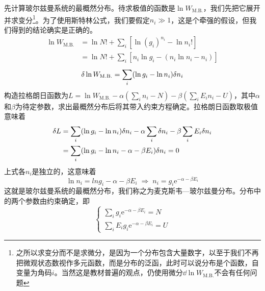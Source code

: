 \documentclass[../../main.tex]{subfiles}
\begin{document}
先计算玻尔兹曼系统的最概然分布。待求极值的函数是\(\ln W_{\mathrm{M.B.}}\)，我们先把它展开并求变分\footnote{之所以求变分而不是求微分，是因为一个分布包含大量数字，以至于我们不再把微观状态数视作多元函数，而是分布的泛函，此时可以说分布是个函数，自变量为角码\(i\)。当然这是教材普遍的观点，仍使用微分\(\dd \ln W_{\mathrm{M.B.}}\)不会有任何问题}。为了使用斯特林公式，我们要假定\(n_i\gg 1\)，这是个牵强的假设，但我们得到的结论确实是正确的。
\begin{equation*}
    \begin{split}
        \ln W_{\mathrm{M.B.}}&=\ln N!+\sum_i \left[\ln (g_i)^{n_i}-\ln n_i!\right]\\
        &=\ln N!+\sum_i [n_i\ln g_i-\left(n_i\ln n_i-n_i\right)]
    \end{split}
\end{equation*}
\begin{equation*}
    \var \ln W_{\mathrm{M.B.}}=\sum_i(\ln g_i-\ln n_i)\var n_i
\end{equation*}
构造拉格朗日函数为\(L=\ln W_{\mathrm{M.B.}}-\alpha\left(\sum_i n_i-N\right)-\beta\left(\sum_i E_in_i-U\right)\)，其中\(\alpha\)和\(\beta\)为待定参数，求出最概然分布后将其带入约束方程确定。拉格朗日函数取极值意味着
\begin{equation*}
    \begin{split}
        \var L&=\sum_i (\ln g_i-\ln n_i)\var n_i-\alpha\sum_i \var n_i-\beta\sum_i E_i\var n_i \\
        &=\sum_i (\ln g_i-\ln n_i-\alpha-\beta E_i)\var n_i=0
    \end{split}
\end{equation*}
上式各\(n_i\)是独立的，这意味着
\begin{equation}
    \ln n_i=ln g_i-\alpha-\beta E_i \; \Longrightarrow \;n_i=g_i\mathrm{e}^{-\alpha-\beta E_i}
\end{equation}
这就是玻尔兹曼系统的最概然分布，我们称之为麦克斯韦—玻尔兹曼分布。分布中的两个参数由约束确定，即
\begin{equation}
    \begin{cases}
        \displaystyle \sum_i g_i\mathrm{e}^{-\alpha-\beta E_i}=N \\
        \displaystyle \sum_i E_ig_i\mathrm{e}^{-\alpha-\beta E_i}=U
    \end{cases}
\end{equation}
\end{document}
